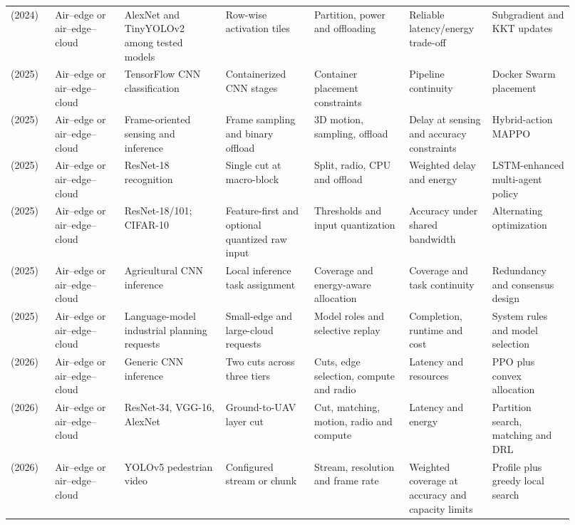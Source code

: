 \begin{longtable}{@{}Y{0.075\linewidth}Y{0.111\linewidth}Y{0.169\linewidth}Y{0.145\linewidth}Y{0.151\linewidth}Y{0.125\linewidth}Y{0.139\linewidth}@{}}
\cite{R0044} (2024) & Air--edge or air--edge--cloud & AlexNet and TinyYOLOv2 among tested models & Row-wise activation tiles & Partition, power and offloading & Reliable latency/\allowbreak{}energy trade-off & Subgradient and KKT updates \\
\cite{R0038} (2025) & Air--edge or air--edge--cloud & TensorFlow CNN classification & Containerized CNN stages & Container placement constraints & Pipeline continuity & Docker Swarm placement \\
\cite{R0064} (2025) & Air--edge or air--edge--cloud & Frame-oriented sensing and inference & Frame sampling and binary offload & 3D motion, sampling, offload & Delay at sensing and accuracy constraints & Hybrid-action MAPPO \\
\cite{R0071} (2025) & Air--edge or air--edge--cloud & ResNet-18 recognition & Single cut at macro-block & Split, radio, CPU and offload & Weighted delay and energy & LSTM-enhanced multi-agent policy \\
\cite{R0080} (2025) & Air--edge or air--edge--cloud & ResNet-18/\allowbreak{}101; CIFAR-10 & Feature-first and optional quantized raw input & Thresholds and input quantization & Accuracy under shared bandwidth & Alternating optimization \\
\cite{R0090} (2025) & Air--edge or air--edge--cloud & Agricultural CNN inference & Local inference task assignment & Coverage and energy-aware allocation & Coverage and task continuity & Redundancy and consensus design \\
\cite{R0145} (2025) & Air--edge or air--edge--cloud & Language-model industrial planning requests & Small-edge and large-cloud requests & Model roles and selective replay & Completion, runtime and cost & System rules and model selection \\
\cite{R0001} (2026) & Air--edge or air--edge--cloud & Generic CNN inference & Two cuts across three tiers & Cuts, edge selection, compute and radio & Latency and resources & PPO plus convex allocation \\
\cite{R0009} (2026) & Air--edge or air--edge--cloud & ResNet-34, VGG-16, AlexNet & Ground-to-UAV layer cut & Cut, matching, motion, radio and compute & Latency and energy & Partition search, matching and DRL \\
\cite{R0036} (2026) & Air--edge or air--edge--cloud & YOLOv5 pedestrian video & Configured stream or chunk & Stream, resolution and frame rate & Weighted coverage at accuracy and capacity limits & Profile plus greedy local search \\

\end{longtable}

